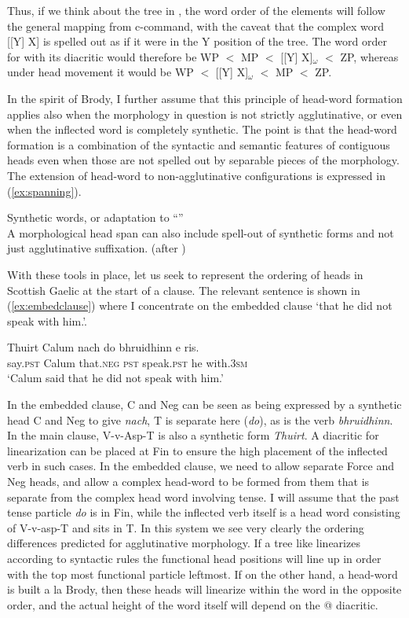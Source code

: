 \documentclass[output=paper,colorlinks,citecolor=brown]{langscibook}
\begin{document}
Thus, if we think about the tree in , the word order of the elements will follow the general mapping from c-command, with the caveat that the complex word [[Y] X] is spelled out as if it were in the Y position of the tree. The word order for  with its diacritic would therefore be   WP $<$ MP   $<$ [[Y] X]$_{\omega}$ $<$ ZP, whereas under head movement it would be WP $<$ [[Y] X]$_{\omega}$    $<$ MP $<$ ZP.

In the spirit of Brody, I further assume that this principle of head-word formation applies also when the morphology in question is not strictly agglutinative, or even when the inflected word is completely synthetic. The point is that the head-word formation is a combination of the syntactic and semantic features of contiguous heads even when those are not spelled out by separable pieces of the morphology. The extension of head-word to non-agglutinative configurations is expressed in (\ref{ex:spanning}). 

\eanoraggedright\label{ex:spanning}
Synthetic words, or adaptation to “”\smallskip\\
A morphological head span can also include spell-out of synthetic forms and not just agglutinative suffixation. (after \citealt{svenonius16, svenonius20})
\z

With these tools in place, let us seek to represent the ordering of heads in Scottish Gaelic at the start of a clause. The relevant sentence is shown in (\ref{ex:embedclause}) where I concentrate on the embedded clause `that he did not speak with him.'.

\ea\label{ex:embedclause}
\gll Thuirt Calum nach do bhruidhinn e  ris. \\
say.\textsc{pst} Calum that.\textsc{neg} \textsc{pst} speak.\textsc{pst} he with.3\textsc{sm} \\
\glt `Calum said that he did not speak with him.'
\z

In the embedded clause, C and Neg can be seen as being expressed by a synthetic head  C and Neg to give \textit{nach}, T is separate here (\textit{do}), as is the verb \textit{bhruidhinn}.  In the main clause, V-v-Asp-T is also a synthetic form \textit{Thuirt}.  A diacritic for linearization can be placed at Fin to ensure the high placement of the inflected verb in such cases. In the embedded clause, we need to allow separate Force and Neg heads, and allow a complex head-word to be formed from them that is separate from the complex head word involving tense.  I will assume that the past tense particle \textit{do} is in Fin, while the inflected verb itself is a head word consisting of V-v-asp-T and sits in T.   In this system we see very clearly the ordering differences predicted for agglutinative morphology. If a tree like  linearizes according to syntactic rules the functional head positions will line up in order with the top most functional particle leftmost. If on the other hand, a head-word is built a la Brody, then these heads will linearize within the word in the opposite order, and the actual height of the word itself will depend on the @ diacritic. 
\end{document}
